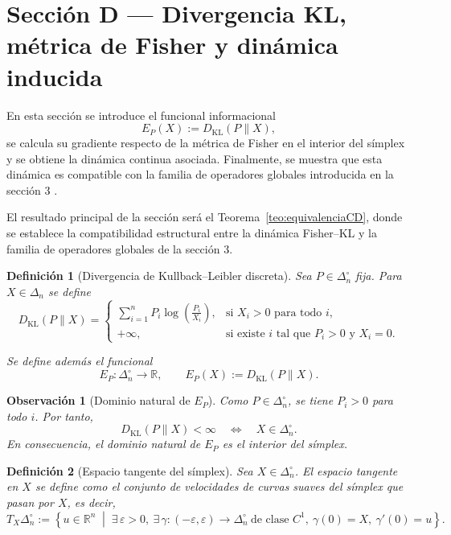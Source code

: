﻿\documentclass[12pt]{article}
\newtheorem{definicion}{Definición}[section]
\newtheorem{observacion}{Observación}[section]
\begin{document}
\section{Sección D — Divergencia KL, métrica de Fisher y dinámica inducida}

En esta sección  se introduce el funcional informacional
\[
E_P(X):=D_{\mathrm{KL}}(P\|X),
\]
se calcula su gradiente respecto de la métrica de Fisher en el interior del símplex y se obtiene la dinámica continua asociada. Finalmente, se muestra que esta dinámica es compatible con la familia de operadores globales introducida en la sección 3 .

El resultado principal de la sección  será el Teorema~\ref{teo:equivalenciaCD}, donde se establece la compatibilidad estructural entre la dinámica Fisher--KL y la familia de operadores globales de la sección 3.

\begin{definicion}[Divergencia de Kullback--Leibler discreta]\label{def:KL}
Sea $P\in\Delta_n^\circ$ fija. Para $X\in\Delta_n$ se define
\[
D_{\mathrm{KL}}(P\|X)
=
\begin{cases}
\displaystyle \sum_{i=1}^n P_i\log\!\left(\frac{P_i}{X_i}\right),
& \text{si } X_i>0 \text{ para todo } i,\\[1em]
+\infty,
& \text{si existe } i \text{ tal que } P_i>0 \text{ y } X_i=0.
\end{cases}
\]

Se define además el funcional
\[
E_P:\Delta_n^\circ\to\mathbb R,
\qquad
E_P(X):=D_{\mathrm{KL}}(P\|X).
\]
\end{definicion}

\begin{observacion}[Dominio natural de $E_P$]\label{obs:KLsoporte}
Como $P\in\Delta_n^\circ$, se tiene $P_i>0$ para todo $i$. Por tanto,
\[
D_{\mathrm{KL}}(P\|X)<\infty
\quad\Longleftrightarrow\quad
X\in\Delta_n^\circ.
\]
En consecuencia, el dominio natural de $E_P$ es el interior del símplex.
\end{observacion}

\begin{definicion}[Espacio tangente del símplex]\label{def:tangente}
Sea $X\in\Delta_n^\circ$. El \emph{espacio tangente en $X$} se define como el conjunto de velocidades de curvas suaves del símplex que pasan por $X$, es decir,
\[
T_X\Delta_n^\circ
:=
\left\{
u\in\mathbb R^n
\;\middle|\;
\exists\,\varepsilon>0,\ \exists\,\gamma:(-\varepsilon,\varepsilon)\to\Delta_n^\circ
\ \text{de clase } C^1,\ 
\gamma(0)=X,\ 
\gamma'(0)=u
\right\}.
\]
\end{definicion}
\end{document}
